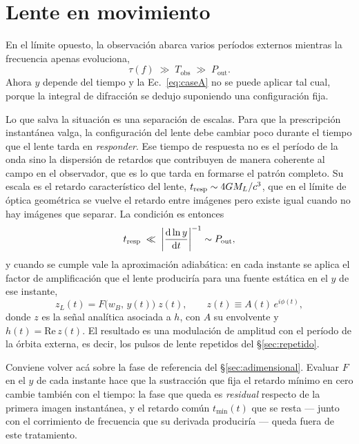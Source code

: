 \documentclass[11pt,a4paper,openany]{book}
\begin{document}
\section{Lente en movimiento}
\label{sec:caseB}

En el l\'imite opuesto, la observaci\'on abarca varios per\'iodos externos
mientras la frecuencia apenas evoluciona,
\begin{equation}
  \tau(f)\;\gg\;T_\mathrm{obs}\;\gg\;P_\mathrm{out} .
  \label{eq:qm_condition}
\end{equation}
Ahora $y$ depende del tiempo y la Ec.~\eqref{eq:caseA} no se puede aplicar tal
cual, porque la integral de difracci\'on se dedujo suponiendo una
configuraci\'on fija.

Lo que salva la situaci\'on es una separaci\'on de escalas. Para que la
prescripci\'on instant\'anea valga, la configuraci\'on del lente debe cambiar
poco durante el tiempo que el lente tarda en \emph{responder}. Ese tiempo de
respuesta no es el per\'iodo de la onda sino la dispersi\'on de retardos que
contribuyen de manera coherente al campo en el observador, que es lo que tarda
en formarse el patr\'on completo. Su escala es el retardo caracter\'istico del
lente, $t_{\rm resp}\sim4GM_L/c^{3}$, que en el l\'imite de \'optica
geom\'etrica se vuelve el retardo entre im\'agenes pero existe igual cuando no
hay im\'agenes que separar. La condici\'on es entonces
\begin{equation}
  t_{\rm resp}\;\ll\;\left|\dv{\ln y}{t}\right|^{-1}\sim P_\mathrm{out} ,
  \label{eq:adiabatic_condition}
\end{equation}
y cuando se cumple vale la aproximaci\'on adiab\'atica: en cada instante se
aplica el factor de amplificaci\'on que el lente producir\'ia para una fuente
est\'atica en el $y$ de ese instante,
\begin{equation}
  z_L(t)=F\big(w_B,\,y(t)\big)\;z(t),
  \qquad
  z(t)\equiv A(t)\,e^{i\phi(t)} ,
  \label{eq:adiabatic}
\end{equation}
donde $z$ es la se\~nal anal\'itica asociada a $h$, con $A$ su envolvente
y $h(t)=\mathrm{Re}\,z(t)$. El resultado es una
modulaci\'on de amplitud con el per\'iodo de la \'orbita externa, es decir, los
pulsos de lente repetidos del \S\ref{sec:repetido}.

Conviene volver ac\'a sobre la fase de referencia del \S\ref{sec:adimensional}.
Evaluar $F$ en el $y$ de cada instante hace que la sustracci\'on que fija el
retardo m\'inimo en cero cambie tambi\'en con el tiempo: la fase que queda es
\emph{residual} respecto de la primera imagen instant\'anea, y el retardo
com\'un $t_{\min}(t)$ que se resta --- junto con el corrimiento de frecuencia
que su derivada producir\'ia --- queda fuera de este tratamiento.
\end{document}
